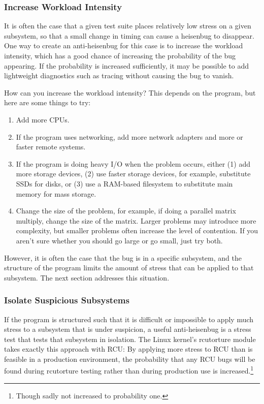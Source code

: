 \subsubsection{Increase Workload Intensity}
\label{sec:debugging:Increase Workload Intensity}

It is often the case that a given test suite places relatively
low stress on a given subsystem, so that a small change in timing
can cause a heisenbug to disappear.
One way to create an anti-heisenbug for this case is to increase
the workload intensity, which has a good chance of increasing the
probability of the bug appearing.
If the probability is increased sufficiently, it may be possible to
add lightweight diagnostics such as tracing without causing the
bug to vanish.

How can you increase the workload intensity?
This depends on the program, but here are some things to try:

\begin{enumerate}
\item	Add more CPUs.
\item	If the program uses networking, add more network adapters
	and more or faster remote systems.
\item	If the program is doing heavy I/O when the problem occurs,
	either (1) add more storage devices, (2) use faster storage
	devices, for example, substitute SSDs for disks,
	or (3) use a RAM-based filesystem to substitute main
	memory for mass storage.
\item	Change the size of the problem, for example, if doing a parallel
	matrix multiply, change the size of the matrix.
	Larger problems may introduce more complexity, but smaller
	problems often increase the level of contention.
	If you aren't sure whether you should go large or go small,
	just try both.
\end{enumerate}

However, it is often the case that the bug is in a specific subsystem,
and the structure of the program limits the amount of stress that can
be applied to that subsystem.
The next section addresses this situation.

\subsubsection{Isolate Suspicious Subsystems}
\label{sec:debugging:Isolate Suspicious Subsystems}

If the program is structured such that it is difficult or impossible
to apply much stress to a subsystem that is under suspicion,
a useful anti-heisenbug is a stress test that tests that subsystem in
isolation.
The Linux kernel's rcutorture module takes exactly this approach with
RCU: By applying more stress to RCU than is feasible in a production
environment, the probability that any RCU bugs will be found during
rcutorture testing rather than during production use is increased.\footnote{
	Though sadly not increased to probability one.}

